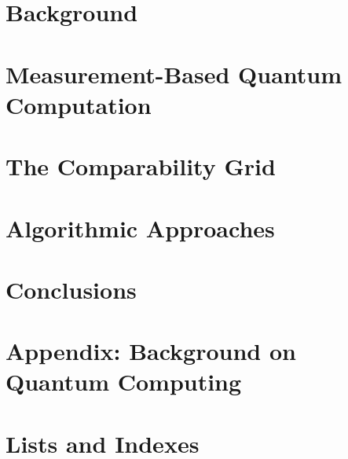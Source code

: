 \documentclass[12pt]{article}
\title{\titletext}
\author{\authortext}
\date{\today}
\begin{document}




\newpage
\tableofcontents

\newpage
{}



\newpage
\section{Background}
\label{sec:background}





\newpage
\section{Measurement-Based Quantum Computation}
\label{sec:mbqc}





\newpage
\section{The Comparability Grid}
\label{sec:cgrid}



\newpage
\section{Algorithmic Approaches}
\label{sec:algorithmic-approaches}





\newpage
\section{Conclusions}
\label{sec:conclusions}

% 

\newpage
\printbibliography
\appendix

\newpage
\section{Appendix: Background on Quantum Computing}
\label{appendix:background}



\newpage
\section{Lists and Indexes}
\listoffigures
\listoftables
\printindex[terms]
\end{document}

